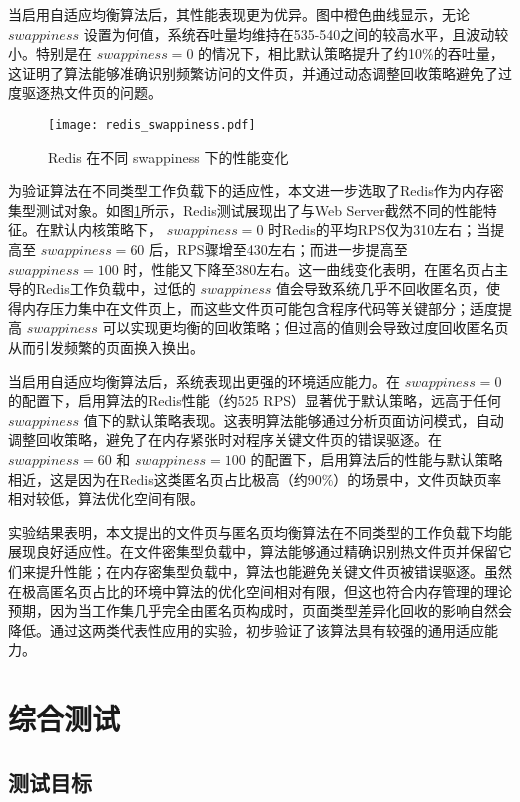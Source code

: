 当启用自适应均衡算法后，其性能表现更为优异。图中橙色曲线显示，无论 \(swappiness\) 设置为何值，系统吞吐量均维持在535-540之间的较高水平，且波动较小。特别是在 \(swappiness =0\) 的情况下，相比默认策略提升了约10\%的吞吐量，这证明了算法能够准确识别频繁访问的文件页，并通过动态调整回收策略避免了过度驱逐热文件页的问题。

\begin{figure}[htbp]
    \centering
    \texttt{[image: redis\_swappiness.pdf]}
    \caption{Redis 在不同 swappiness 下的性能变化}
    \label{fig:redis_swappiness}
\end{figure}

为验证算法在不同类型工作负载下的适应性，本文进一步选取了Redis作为内存密集型测试对象。如图\ref{fig:redis_swappiness}所示，Redis测试展现出了与Web Server截然不同的性能特征。在默认内核策略下， \(swappiness =0\) 时Redis的平均RPS仅为310左右；当提高至 \(swappiness =60\) 后，RPS骤增至430左右；而进一步提高至 \(swappiness =100\) 时，性能又下降至380左右。这一曲线变化表明，在匿名页占主导的Redis工作负载中，过低的 \(swappiness\) 值会导致系统几乎不回收匿名页，使得内存压力集中在文件页上，而这些文件页可能包含程序代码等关键部分；适度提高 \(swappiness\) 可以实现更均衡的回收策略；但过高的值则会导致过度回收匿名页从而引发频繁的页面换入换出。

当启用自适应均衡算法后，系统表现出更强的环境适应能力。在 \(swappiness =0\) 的配置下，启用算法的Redis性能（约525 RPS）显著优于默认策略，远高于任何 \(swappiness\) 值下的默认策略表现。这表明算法能够通过分析页面访问模式，自动调整回收策略，避免了在内存紧张时对程序关键文件页的错误驱逐。在 \(swappiness =60\) 和 \(swappiness =100\) 的配置下，启用算法后的性能与默认策略相近，这是因为在Redis这类匿名页占比极高（约90\%）的场景中，文件页缺页率相对较低，算法优化空间有限。

实验结果表明，本文提出的文件页与匿名页均衡算法在不同类型的工作负载下均能展现良好适应性。在文件密集型负载中，算法能够通过精确识别热文件页并保留它们来提升性能；在内存密集型负载中，算法也能避免关键文件页被错误驱逐。虽然在极高匿名页占比的环境中算法的优化空间相对有限，但这也符合内存管理的理论预期，因为当工作集几乎完全由匿名页构成时，页面类型差异化回收的影响自然会降低。通过这两类代表性应用的实验，初步验证了该算法具有较强的通用适应能力。

\section{综合测试}

\subsection{测试目标}

